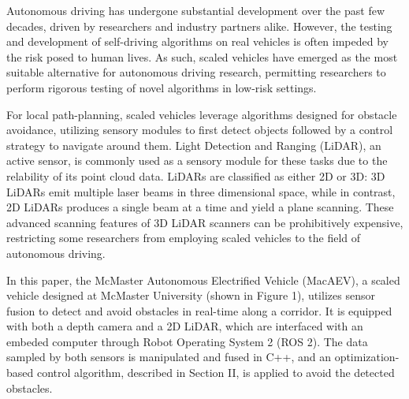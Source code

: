 \documentclass[conference]{IEEEtran}
\begin{document}

Autonomous driving has undergone substantial development over the past few decades, driven by researchers and industry partners alike. However, the testing and development of self-driving algorithms on real vehicles is often impeded by the risk posed to human lives. As such, scaled vehicles have emerged as the most suitable alternative for autonomous driving research, permitting researchers to perform rigorous testing of novel algorithms in low-risk settings. 


For local path-planning, scaled vehicles leverage algorithms designed for obstacle avoidance, utilizing sensory modules to first detect objects followed by a control strategy to navigate around them. Light Detection and Ranging (LiDAR), an active sensor, is commonly used as a sensory module for these tasks due to the relability of its point cloud data. LiDARs are classified as either 2D or 3D: 3D LiDARs emit multiple laser beams in three dimensional space, while in contrast, 2D LiDARs produces a single beam at a time and yield a plane scanning. These advanced scanning features of 3D LiDAR scanners can be prohibitively expensive, restricting some researchers from employing scaled vehicles to the field of autonomous driving.

In this paper, the McMaster Autonomous Electrified Vehicle (MacAEV), a scaled vehicle designed at McMaster University (shown in Figure 1), utilizes sensor fusion to detect and avoid obstacles in real-time along a corridor. It is equipped with both a depth camera and a 2D LiDAR, which are interfaced with an embeded computer through Robot Operating System 2 (ROS 2). The data sampled by both sensors is manipulated and fused in C++, and an optimization-based control algorithm, described in Section II, is applied to avoid the detected obstacles. 


\end{document}
